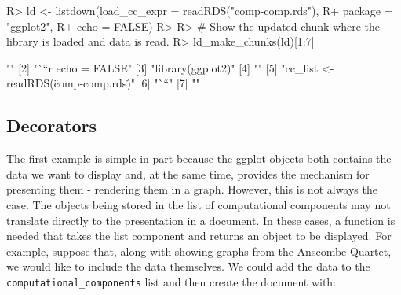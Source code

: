 \documentclass[
]{jss}
\begin{document}
\begin{CodeChunk}

\begin{CodeInput}
R> ld <- listdown(load_cc_expr = readRDS("comp-comp.rds"), 
R+                package = "ggplot2",
R+                echo = FALSE)
R> 
R> # Show the updated chunk where the library is loaded and data is read.
R> ld_make_chunks(ld)[1:7]
\end{CodeInput}

\begin{CodeOutput}
[1] ""                                     
[2] "```{r echo = FALSE}"                  
[3] "library(ggplot2)"                     
[4] ""                                     
[5] "cc_list <- readRDS(\"comp-comp.rds\")"
[6] "```"                                  
[7] ""                                     
\end{CodeOutput}
\end{CodeChunk}

\hypertarget{decorators}{%
\subsection{Decorators}\label{decorators}}

The first example is simple in part because the ggplot objects both
contains the data we want to display and, at the same time, provides the
mechanism for presenting them - rendering them in a graph. However, this
is not always the case. The objects being stored in the list of
computational components may not translate directly to the presentation
in a document. In these cases, a function is needed that takes the list
component and returns an object to be displayed. For example, suppose
that, along with showing graphs from the Anscombe Quartet, we would like
to include the data themselves. We could add the data to the
\texttt{computational\_components} list and then create the document
with:

\begin{CodeChunk}


\end{CodeChunk}
\end{document}
